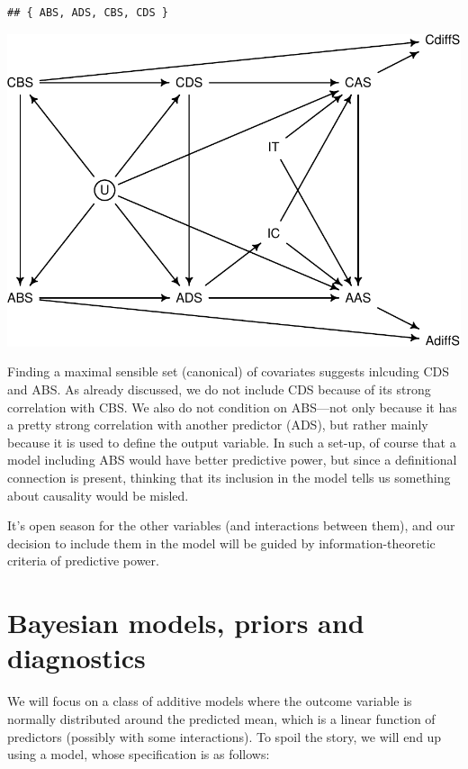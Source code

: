 \documentclass[10pt,dvipsnames,enabledeprecatedfontcommands]{scrartcl}
\begin{document}
\begin{verbatim}
## { ABS, ADS, CBS, CDS }
\end{verbatim}

\begin{center}\includegraphics[width=0.8\linewidth]{bayesianReport_files/figure-latex/dag2-1} \end{center}

Finding a maximal sensible set (canonical) of covariates suggests
inlcuding \textsf{CDS} and \textsf{ABS}. As already discussed, we do not
include \textsf{CDS} because of its strong correlation with
\textsf{CBS}. We also do not condition on \textsf{ABS}---not only
because it has a pretty strong correlation with another predictor
(\textsf{ADS}), but rather mainly because it is used to define the
output variable. In such a set-up, of course that a model including
\textsf{ABS} would have better predictive power, but since a
definitional connection is present, thinking that its inclusion in the
model tells us something about causality would be misled.

It's open season for the other variables (and interactions between
them), and our decision to include them in the model will be guided by
information-theoretic criteria of predictive power.

\section{Bayesian models, priors and
diagnostics}\label{bayesian-models-priors-and-diagnostics}

We will focus on a class of additive models where the outcome variable
is normally distributed around the predicted mean, which is a linear
function of predictors (possibly with some interactions). To spoil the
story, we will end up using a model, whose specification is as follows:
\end{document}
